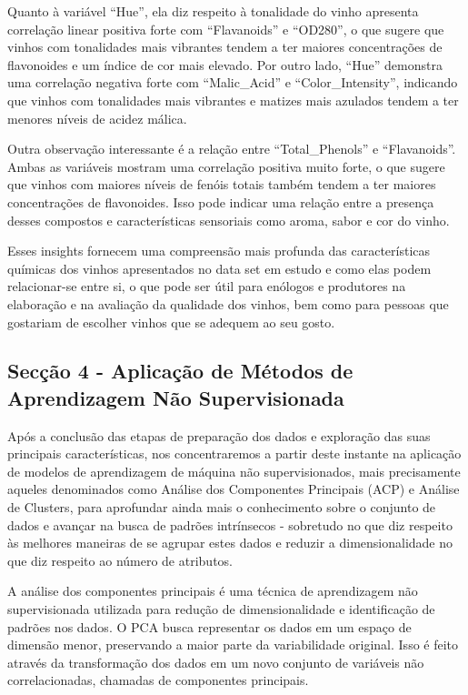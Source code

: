 \documentclass[
  letterpaper,
  DIV=11,
  numbers=noendperiod]{scrartcl}
\begin{document}
Quanto à variável ``Hue'', ela diz respeito à tonalidade do vinho
apresenta correlação linear positiva forte com ``Flavanoids'' e
``OD280'', o que sugere que vinhos com tonalidades mais vibrantes tendem
a ter maiores concentrações de flavonoides e um índice de cor mais
elevado. Por outro lado, ``Hue'' demonstra uma correlação negativa forte
com ``Malic\_Acid'' e ``Color\_Intensity'', indicando que vinhos com
tonalidades mais vibrantes e matizes mais azulados tendem a ter menores
níveis de acidez málica.

Outra observação interessante é a relação entre ``Total\_Phenols'' e
``Flavanoids''. Ambas as variáveis mostram uma correlação positiva muito
forte, o que sugere que vinhos com maiores níveis de fenóis totais
também tendem a ter maiores concentrações de flavonoides. Isso pode
indicar uma relação entre a presença desses compostos e características
sensoriais como aroma, sabor e cor do vinho.

Esses insights fornecem uma compreensão mais profunda das
características químicas dos vinhos apresentados no data set em estudo e
como elas podem relacionar-se entre si, o que pode ser útil para
enólogos e produtores na elaboração e na avaliação da qualidade dos
vinhos, bem como para pessoas que gostariam de escolher vinhos que se
adequem ao seu gosto.

\subsection{Secção 4 - Aplicação de Métodos de Aprendizagem Não
Supervisionada}\label{secuxe7uxe3o-4---aplicauxe7uxe3o-de-muxe9todos-de-aprendizagem-nuxe3o-supervisionada}

Após a conclusão das etapas de preparação dos dados e exploração das
suas principais características, nos concentraremos a partir deste
instante na aplicação de modelos de aprendizagem de máquina não
supervisionados, mais precisamente aqueles denominados como Análise dos
Componentes Principais (ACP) e Análise de Clusters, para aprofundar
ainda mais o conhecimento sobre o conjunto de dados e avançar na busca
de padrões intrínsecos - sobretudo no que diz respeito às melhores
maneiras de se agrupar estes dados e reduzir a dimensionalidade no que
diz respeito ao número de atributos.

A análise dos componentes principais é uma técnica de aprendizagem não
supervisionada utilizada para redução de dimensionalidade e
identificação de padrões nos dados. O PCA busca representar os dados em
um espaço de dimensão menor, preservando a maior parte da variabilidade
original. Isso é feito através da transformação dos dados em um novo
conjunto de variáveis não correlacionadas, chamadas de componentes
principais.
\end{document}
